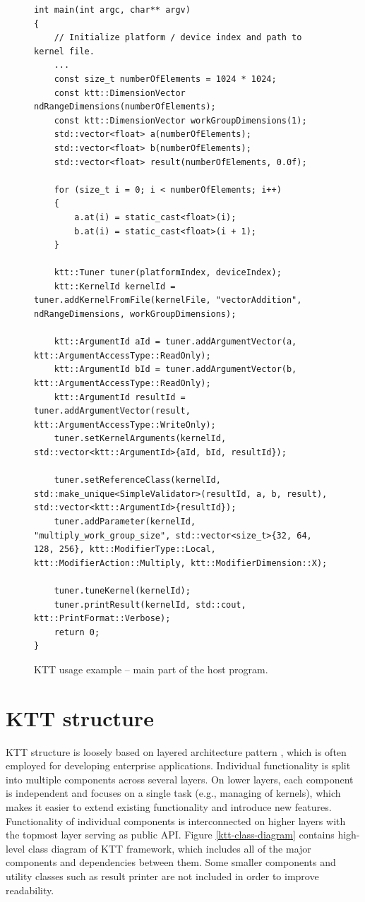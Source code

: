 \documentclass
[
    digital, %
    oneside, %
    table, %
    nolof, %
    nolot, %
    nocover %
]{fithesis3}
\begin{document}
\begin{figure}
\footnotesize
\begin{adjustwidth}{-1cm}{-1cm}
\begin{lstlisting}
int main(int argc, char** argv)
{
    // Initialize platform / device index and path to kernel file.
    ...
    const size_t numberOfElements = 1024 * 1024;
    const ktt::DimensionVector ndRangeDimensions(numberOfElements);
    const ktt::DimensionVector workGroupDimensions(1);
    std::vector<float> a(numberOfElements);
    std::vector<float> b(numberOfElements);
    std::vector<float> result(numberOfElements, 0.0f);
    
    for (size_t i = 0; i < numberOfElements; i++)
    {
        a.at(i) = static_cast<float>(i);
        b.at(i) = static_cast<float>(i + 1);
    }
    
    ktt::Tuner tuner(platformIndex, deviceIndex);
    ktt::KernelId kernelId = tuner.addKernelFromFile(kernelFile, "vectorAddition", ndRangeDimensions, workGroupDimensions);
    
    ktt::ArgumentId aId = tuner.addArgumentVector(a, ktt::ArgumentAccessType::ReadOnly);
    ktt::ArgumentId bId = tuner.addArgumentVector(b, ktt::ArgumentAccessType::ReadOnly);
    ktt::ArgumentId resultId = tuner.addArgumentVector(result, ktt::ArgumentAccessType::WriteOnly);
    tuner.setKernelArguments(kernelId, std::vector<ktt::ArgumentId>{aId, bId, resultId});
    
    tuner.setReferenceClass(kernelId, std::make_unique<SimpleValidator>(resultId, a, b, result), std::vector<ktt::ArgumentId>{resultId});
    tuner.addParameter(kernelId, "multiply_work_group_size", std::vector<size_t>{32, 64, 128, 256}, ktt::ModifierType::Local, ktt::ModifierAction::Multiply, ktt::ModifierDimension::X);
    
    tuner.tuneKernel(kernelId);
    tuner.printResult(kernelId, std::cout, ktt::PrintFormat::Verbose);
    return 0;
}
\end{lstlisting}
\caption{KTT usage example -- main part of the host program.}
\label{ktt-api-usage}
\end{adjustwidth}
\end{figure}

\chapter{KTT structure}
\label{ktt-structure}
KTT structure is loosely based on layered architecture pattern \cite{software-architectures}, which is often employed for developing enterprise
applications. Individual functionality is split into multiple components across several layers. On lower layers, each component is independent and
focuses on a single task (e.g., managing of kernels), which makes it easier to extend existing functionality and introduce new features. Functionality
of individual components is interconnected on higher layers with the topmost layer serving as public API. Figure \ref{ktt-class-diagram} contains
high-level class diagram of KTT framework, which includes all of the major components and dependencies between them. Some smaller components and utility
classes such as result printer are not included in order to improve readability.
\end{document}
